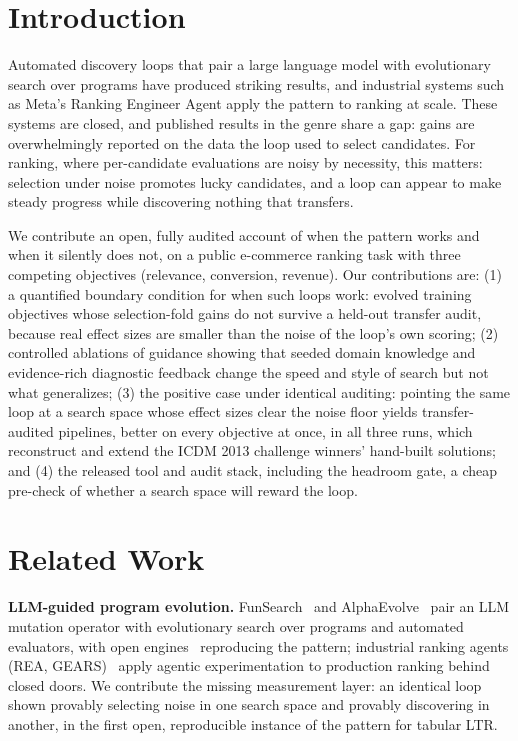 \documentclass[]{ceurart}
\begin{document}
\maketitle

\section{Introduction}
Automated discovery loops that pair a large language model with evolutionary
search over programs have produced striking results, and industrial systems
such as Meta's Ranking Engineer Agent apply the pattern to ranking at scale.
These systems are closed, and published results in the genre share a gap:
gains are overwhelmingly reported on the data the loop used to select
candidates. For ranking, where per-candidate evaluations are noisy by
necessity, this matters: selection under noise promotes lucky candidates,
and a loop can appear to make steady progress while discovering nothing
that transfers.

We contribute an open, fully audited account of when the pattern works
and when it silently does not, on a public e-commerce ranking task with
three competing objectives (relevance, conversion, revenue). Our contributions are:
(1) a quantified boundary condition for when such loops work: evolved training objectives whose selection-fold gains do not survive a
held-out transfer audit, because real effect sizes are smaller than the
noise of the loop's own scoring; (2) controlled ablations of guidance showing
that seeded domain knowledge and evidence-rich diagnostic feedback change the
speed and style of search but not what generalizes; (3) the positive case under identical auditing: pointing the same loop at a search space whose
effect sizes clear the noise floor yields transfer-audited pipelines,
better on every objective at once, in all three runs, which reconstruct and extend the ICDM 2013 challenge winners' hand-built
solutions; and (4) the released tool and audit stack, including the headroom gate, a cheap pre-check of whether a search space
will reward the loop.

\section{Related Work}
\textbf{LLM-guided program evolution.} FunSearch~\cite{funsearch} and
AlphaEvolve~\cite{alphaevolve} pair an LLM
mutation operator with evolutionary search over programs and automated
evaluators, with open engines~\cite{adaevolve,evox} reproducing the pattern;
industrial ranking agents (REA, GEARS)~\cite{rea} apply agentic
experimentation to production ranking behind closed doors. We contribute the missing measurement layer: an identical loop shown provably selecting noise in one search space and
provably discovering in another, in the first open, reproducible instance
of the pattern for tabular LTR.
\end{document}
